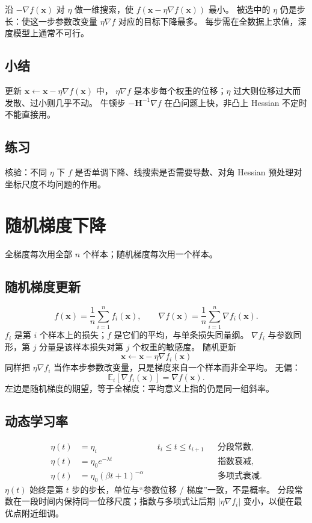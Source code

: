 沿 $-\nabla f(\bm{x})$ 对 $\eta$ 做一维搜索，使
$f(\bm{x}-\eta\nabla f(\bm{x}))$ 最小。
被选中的 $\eta$ 仍是步长：使这一步参数改变量 $\eta\nabla f$ 对应的目标下降最多。
每步需在全数据上求值，深度模型上通常不可行。

\subsection{小结}

更新 $\bm{x}\leftarrow\bm{x}-\eta\nabla f(\bm{x})$ 中，
$\eta\nabla f$ 是本步每个权重的位移；$\eta$ 过大则位移过大而发散、过小则几乎不动。
牛顿步 $-\bm{H}^{-1}\nabla f$ 在凸问题上快，非凸上 Hessian 不定时不能直接用。

\subsection{练习}

核验：不同 $\eta$ 下 $f$ 是否单调下降、线搜索是否需要导数、对角 Hessian 预处理对坐标尺度不均问题的作用。

\section{随机梯度下降}

全梯度每次用全部 $n$ 个样本；随机梯度每次用一个样本。

\subsection{随机梯度更新}

\[
f(\bm{x})=\frac1n\sum_{i=1}^{n}f_i(\bm{x}),
\qquad
\nabla f(\bm{x})=\frac1n\sum_{i=1}^{n}\nabla f_i(\bm{x}).
\]
$f_i$ 是第 $i$ 个样本上的损失；$f$ 是它们的平均，与单条损失同量纲。
$\nabla f_i$ 与参数同形，第 $j$ 分量是该样本损失对第 $j$ 个权重的敏感度。
随机更新
\[
\bm{x}\leftarrow \bm{x}-\eta\nabla f_i(\bm{x})
\]
同样把 $\eta\nabla f_i$ 当作本步参数改变量，只是梯度来自一个样本而非全平均。
无偏：
\[
\mathbb{E}_i[\nabla f_i(\bm{x})]=\nabla f(\bm{x}).
\]
左边是随机梯度的期望，等于全梯度：平均意义上指的仍是同一组斜率。

\subsection{动态学习率}

\begin{align*}
\eta(t)&=\eta_i
&& t_i\leq t\leq t_{i+1}
&&\text{分段常数},
\\
\eta(t)&=\eta_0 e^{-\lambda t}
&&
&&\text{指数衰减},
\\
\eta(t)&=\eta_0(\beta t+1)^{-\alpha}
&&
&&\text{多项式衰减}.
\end{align*}
$\eta(t)$ 始终是第 $t$ 步的步长，单位与“参数位移 / 梯度”一致，不是概率。
分段常数在一段时间内保持同一位移尺度；指数与多项式让后期 $|\eta\nabla f_i|$ 变小，以便在最优点附近细调。

